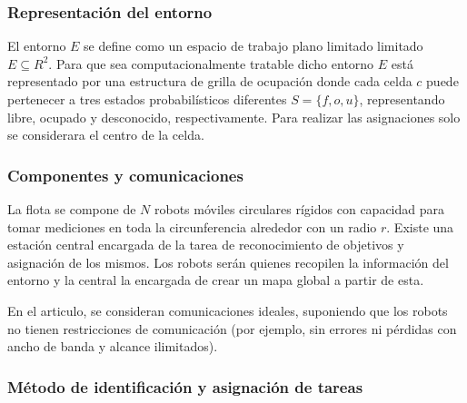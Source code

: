 
\subsubsection{Representación del entorno}
El entorno $E$ se define como un espacio de trabajo plano limitado limitado $E\subseteq R^2$. Para que sea computacionalmente tratable dicho entorno $E$ está representado por una estructura de grilla de ocupación donde cada celda $c$ puede pertenecer a tres estados probabilísticos diferentes $S = \{f, o, u\}$, representando libre, ocupado y desconocido, respectivamente. Para realizar las asignaciones solo se considerara el centro de la celda.

\subsubsection{Componentes y comunicaciones}
La flota se compone de $N$ robots móviles circulares rígidos con capacidad para tomar mediciones en toda la circunferencia alrededor con un radio $r$. Existe una estación central encargada de la tarea de reconocimiento de objetivos y asignación de los mismos. Los robots serán quienes recopilen la información del entorno y la central la encargada de crear un mapa global a partir de esta. 

En el articulo, se consideran comunicaciones ideales, suponiendo que los robots no tienen restricciones de comunicación (por ejemplo, sin errores ni pérdidas con ancho de banda y alcance ilimitados). %

\subsubsection{Método de identificación y asignación de tareas}

